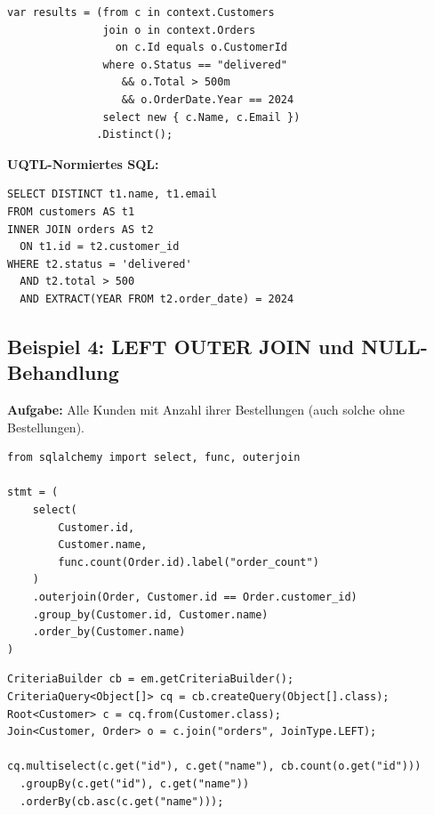 \begin{lstlisting}[style=csharpstyle, caption={Beispiel 3 -- C\# (JOIN)},
  label=lst:bsp3_cs]
var results = (from c in context.Customers
               join o in context.Orders
                 on c.Id equals o.CustomerId
               where o.Status == "delivered"
                  && o.Total > 500m
                  && o.OrderDate.Year == 2024
               select new { c.Name, c.Email })
              .Distinct();
\end{lstlisting}

\begin{successbox}
\textbf{UQTL-Normiertes SQL:}
\begin{lstlisting}[style=sqlstyle, numbers=none]
SELECT DISTINCT t1.name, t1.email
FROM customers AS t1
INNER JOIN orders AS t2
  ON t1.id = t2.customer_id
WHERE t2.status = 'delivered'
  AND t2.total > 500
  AND EXTRACT(YEAR FROM t2.order_date) = 2024
\end{lstlisting}
\end{successbox}

\subsection{Beispiel 4: LEFT OUTER JOIN und NULL-Behandlung}
\label{subsec:bsp4}

\textbf{Aufgabe:} Alle Kunden mit Anzahl ihrer Bestellungen (auch solche ohne Bestellungen).

\begin{lstlisting}[style=pythonstyle, caption={Beispiel 4 -- Python (LEFT JOIN)},
  label=lst:bsp4_py]
from sqlalchemy import select, func, outerjoin

stmt = (
    select(
        Customer.id,
        Customer.name,
        func.count(Order.id).label("order_count")
    )
    .outerjoin(Order, Customer.id == Order.customer_id)
    .group_by(Customer.id, Customer.name)
    .order_by(Customer.name)
)
\end{lstlisting}

\begin{lstlisting}[style=javastyle, caption={Beispiel 4 -- Java (LEFT JOIN)},
  label=lst:bsp4_java]
CriteriaBuilder cb = em.getCriteriaBuilder();
CriteriaQuery<Object[]> cq = cb.createQuery(Object[].class);
Root<Customer> c = cq.from(Customer.class);
Join<Customer, Order> o = c.join("orders", JoinType.LEFT);

cq.multiselect(c.get("id"), c.get("name"), cb.count(o.get("id")))
  .groupBy(c.get("id"), c.get("name"))
  .orderBy(cb.asc(c.get("name")));
\end{lstlisting}

